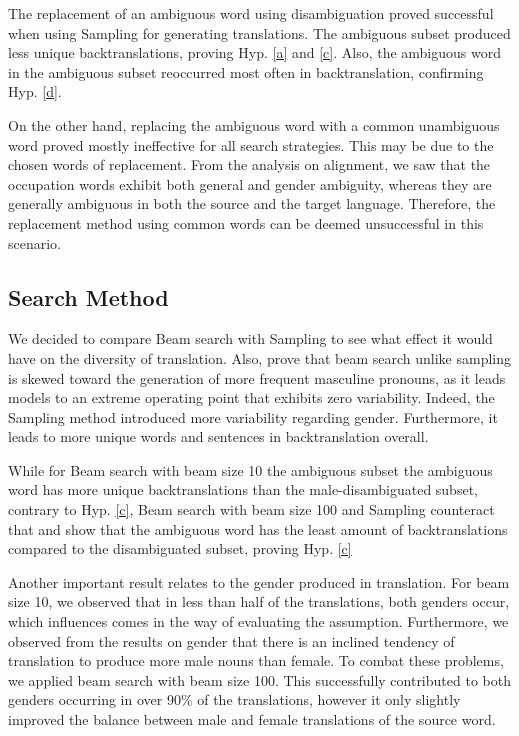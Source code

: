 The replacement of an ambiguous word using disambiguation proved successful when using Sampling for generating translations. The ambiguous subset produced less unique backtranslations, proving Hyp. \ref{a} and \ref{c}. Also, the ambiguous word in the ambiguous subset reoccurred most often in backtranslation, confirming Hyp. \ref{d}.

On the other hand, replacing the ambiguous word with a common unambiguous word proved mostly ineffective for all search strategies. This may be due to the chosen words of replacement. From the analysis on alignment, we saw that the occupation words exhibit both general and gender ambiguity, whereas they are generally ambiguous in both the source and the target language. Therefore, the replacement method using common words can be deemed unsuccessful in this scenario.


\subsection{Search Method} %

We decided to compare Beam search with Sampling to see what effect it would have on the diversity of translation. Also, \citet{roberts2020decoding} prove that beam search unlike sampling is skewed toward the generation of more frequent masculine pronouns, as it leads models to an extreme operating point that exhibits zero variability. Indeed, the Sampling method introduced more variability regarding gender. Furthermore, it leads to more unique words and sentences in backtranslation overall. 

While for Beam search with beam size 10 the ambiguous subset the ambiguous word has more unique backtranslations than the male-disambiguated subset, contrary to Hyp. \ref{c}, Beam search with beam size 100 and Sampling counteract that and show that the ambiguous word has the least amount of backtranslations compared to the disambiguated subset, proving Hyp. \ref{c}


Another important result relates to the gender produced in translation. For beam size 10, we observed that in less than half of the translations, both genders occur, which influences comes in the way of evaluating the assumption. Furthermore, we observed from the results on gender that there is an inclined tendency of translation to produce more male nouns than female. To combat these problems, we applied beam search with beam size 100. This successfully contributed to both genders occurring in over 90\% of the translations, however it only slightly improved the balance between male and female translations of the source word.


